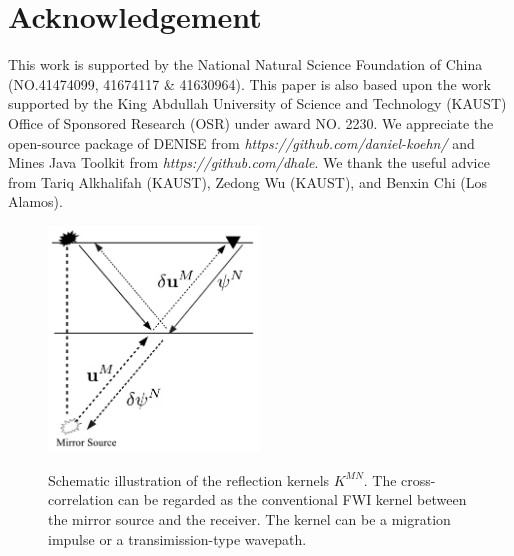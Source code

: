 \section{Acknowledgement}
This work is supported by the
National Natural Science Foundation of China (NO.41474099, 41674117 \& 41630964). 
This paper is also based upon the work supported by the King Abdullah University of Science
and Technology (KAUST) Office of Sponsored Research (OSR) under award NO. 2230.
We appreciate the open-source package of DENISE from
\textit{https://github.com/daniel-koehn/} and Mines Java Toolkit from
\textit{https://github.com/dhale}.
We thank the useful advice from Tariq Alkhalifah (KAUST), Zedong Wu (KAUST),
and Benxin Chi (Los Alamos).
\clearpage
\begin{figure}
   \centering
   {\includegraphics[width=0.5\textwidth]{Kernel/Combinations/K_MN.pdf}}
   \caption{Schematic illustration of the reflection kernels $K^{MN}$. The
   cross-correlation can be regarded as the conventional FWI kernel between the mirror
   source and the receiver. The kernel can be a migration impulse or a
   transimission-type wavepath.}
   \label{fig:kernel_mirror_src}
\end{figure}

